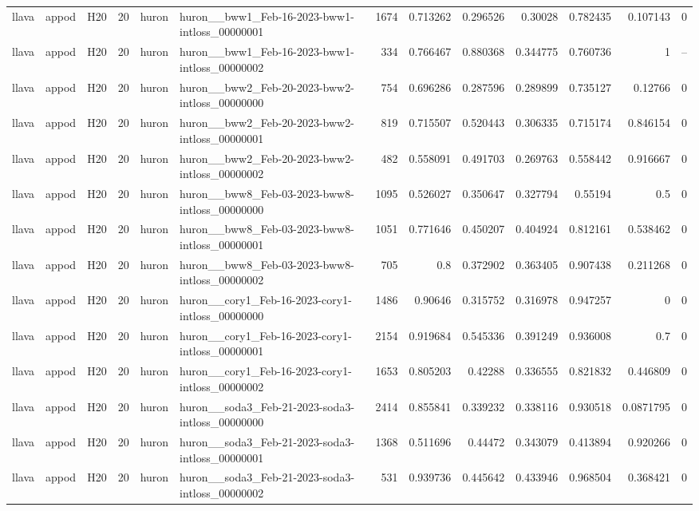 \begin{longtable}{lllrllrrrrrrr}
llava & appod & H20 & 20 & huron & huron\_\_bww1\_Feb-16-2023-bww1-intloss\_00000001 & 1674 & 0.713262 & 0.296526 & 0.30028 & 0.782435 & 0.107143 & 0 \\
llava & appod & H20 & 20 & huron & huron\_\_bww1\_Feb-16-2023-bww1-intloss\_00000002 & 334 & 0.766467 & 0.880368 & 0.344775 & 0.760736 & 1 & -- \\
llava & appod & H20 & 20 & huron & huron\_\_bww2\_Feb-20-2023-bww2-intloss\_00000000 & 754 & 0.696286 & 0.287596 & 0.289899 & 0.735127 & 0.12766 & 0 \\
llava & appod & H20 & 20 & huron & huron\_\_bww2\_Feb-20-2023-bww2-intloss\_00000001 & 819 & 0.715507 & 0.520443 & 0.306335 & 0.715174 & 0.846154 & 0 \\
llava & appod & H20 & 20 & huron & huron\_\_bww2\_Feb-20-2023-bww2-intloss\_00000002 & 482 & 0.558091 & 0.491703 & 0.269763 & 0.558442 & 0.916667 & 0 \\
llava & appod & H20 & 20 & huron & huron\_\_bww8\_Feb-03-2023-bww8-intloss\_00000000 & 1095 & 0.526027 & 0.350647 & 0.327794 & 0.55194 & 0.5 & 0 \\
llava & appod & H20 & 20 & huron & huron\_\_bww8\_Feb-03-2023-bww8-intloss\_00000001 & 1051 & 0.771646 & 0.450207 & 0.404924 & 0.812161 & 0.538462 & 0 \\
llava & appod & H20 & 20 & huron & huron\_\_bww8\_Feb-03-2023-bww8-intloss\_00000002 & 705 & 0.8 & 0.372902 & 0.363405 & 0.907438 & 0.211268 & 0 \\
llava & appod & H20 & 20 & huron & huron\_\_cory1\_Feb-16-2023-cory1-intloss\_00000000 & 1486 & 0.90646 & 0.315752 & 0.316978 & 0.947257 & 0 & 0 \\
llava & appod & H20 & 20 & huron & huron\_\_cory1\_Feb-16-2023-cory1-intloss\_00000001 & 2154 & 0.919684 & 0.545336 & 0.391249 & 0.936008 & 0.7 & 0 \\
llava & appod & H20 & 20 & huron & huron\_\_cory1\_Feb-16-2023-cory1-intloss\_00000002 & 1653 & 0.805203 & 0.42288 & 0.336555 & 0.821832 & 0.446809 & 0 \\
llava & appod & H20 & 20 & huron & huron\_\_soda3\_Feb-21-2023-soda3-intloss\_00000000 & 2414 & 0.855841 & 0.339232 & 0.338116 & 0.930518 & 0.0871795 & 0 \\
llava & appod & H20 & 20 & huron & huron\_\_soda3\_Feb-21-2023-soda3-intloss\_00000001 & 1368 & 0.511696 & 0.44472 & 0.343079 & 0.413894 & 0.920266 & 0 \\
llava & appod & H20 & 20 & huron & huron\_\_soda3\_Feb-21-2023-soda3-intloss\_00000002 & 531 & 0.939736 & 0.445642 & 0.433946 & 0.968504 & 0.368421 & 0 \\

\end{longtable}
